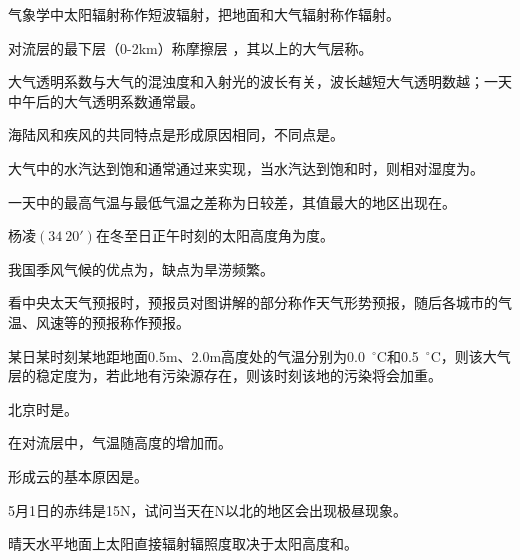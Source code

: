 \documentclass[Tailscore,contitemcnt,answers]{nwsuafexam}%
\begin{document}
	\begin{questions}

		\question 
		气象学中太阳辐射称作短波辐射，把地面和大气辐射称作辐射。
		
		\question
		对流层的最下层（0-2km）称摩擦层 ，其以上的大气层称。
		
		\question
		大气透明系数与大气的混浊度和入射光的波长有关，波长越短大气透明数越；一天中午后的大气透明系数通常最。
		
		\question
		海陆风和疾风的共同特点是形成原因相同，不同点是。
		
		\question
		大气中的水汽达到饱和通常通过来实现，当水汽达到饱和时，则相对湿度为。
		
		\question
		一天中的最高气温与最低气温之差称为日较差，其值最大的地区出现在。
		
		\question
		杨凌$(34~20')$在冬至日正午时刻的太阳高度角为度。
		
		\question
		我国季风气候的优点为，缺点为旱涝频繁。
		
		\question
		看中央太天气预报时，预报员对图讲解的部分称作天气形势预报，随后各城市的气温、风速等的预报称作预报。
		
		\question
		某日某时刻某地距地面0.5m、2.0m高度处的气温分别为0.0~$^{\circ}$C和0.5~$^{\circ}$C，则该大气层的稳定度为，若此地有污染源存在，则该时刻该地的污染将会加重。
		
		\question 
		北京时是\selectline。
		
	    \question
	    在对流层中，气温随高度的增加而\selectline。
		
		\question
		形成云的基本原因是\selectline。
		
		\question
	    5月1日的赤纬是15N，试问当天在\selectline N以北的地区会出现极昼现象。
	    
	    \question
	    晴天水平地面上太阳直接辐射辐照度取决于太阳高度和\selectline。
	    

\end{questions}
\end{document}
